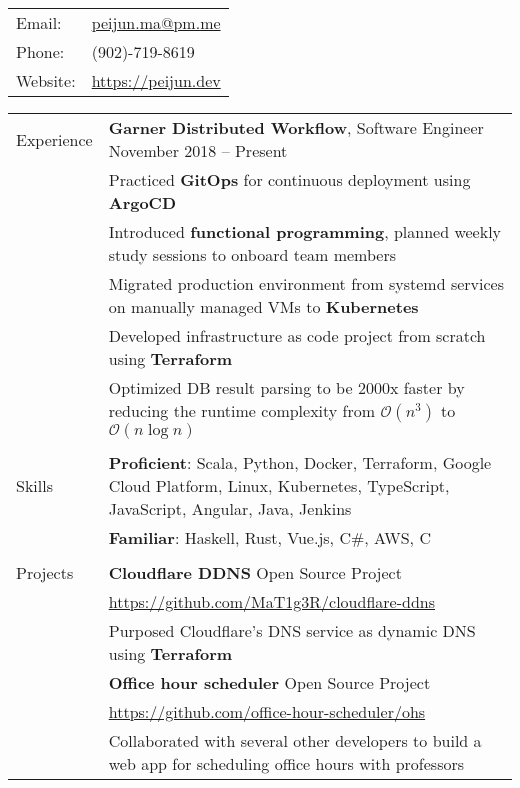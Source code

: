 \documentclass[letterpaper,12pt,oneside]{article}
\newcommand{\smallurl}[1]{\scriptsize{\url{#1}}}
\newcommand{\tabitem}{\hspace{0.2cm}\textbullet\hspace{0.2cm}}
\begin{document}
\begin{tabular}{l l}
    Email: & \href{mailto:peijun.ma@pm.me}{peijun.ma@pm.me} \\
    Phone: & (902)-719-8619 \\
    Website: & \href{https://peijun.dev}{https://peijun.dev}
\end{tabular}

\noindent \begin{longtable}{@{} l p{14cm}}
\Large{Experience}
& \textbf{Garner Distributed Workflow}, Software Engineer \hspace*{\fill} November 2018 -- Present \\
& \tabitem
Practiced \textbf{GitOps} for continuous deployment using \textbf{ArgoCD} \\
& \tabitem
Introduced \textbf{functional programming}, planned weekly study sessions to onboard team members \\
& \tabitem
Migrated production environment from systemd services on manually managed VMs to \textbf{Kubernetes} \\
& \tabitem
Developed infrastructure as code project from scratch using \textbf{Terraform} \\
& \tabitem
Optimized DB result parsing to be 2000x faster by reducing the runtime complexity from $\mathcal{O}(n^3)$ to $\mathcal{O}(n\log{}n)$ \\
& \\
\Large{Skills}
& \textbf{Proficient}: Scala, Python, Docker, Terraform, Google Cloud Platform, Linux, Kubernetes, TypeScript, JavaScript, Angular, Java, Jenkins \\
& \textbf{Familiar}: Haskell, Rust, Vue.js, C\#, AWS, C \\
& \\
\Large{Projects}
& \textbf{Cloudflare DDNS} \hspace*{\fill} Open Source Project \\
& \smallurl{https://github.com/MaT1g3R/cloudflare-ddns} \\
& \tabitem
Purposed Cloudflare's DNS service as dynamic DNS using \textbf{Terraform} \\
& \textbf{Office hour scheduler}\hspace*{\fill} Open Source Project \\
& \smallurl{https://github.com/office-hour-scheduler/ohs} \\
& \tabitem
Collaborated with several other developers to build a web app for scheduling office hours with professors \\

\end{longtable}
\end{document}
